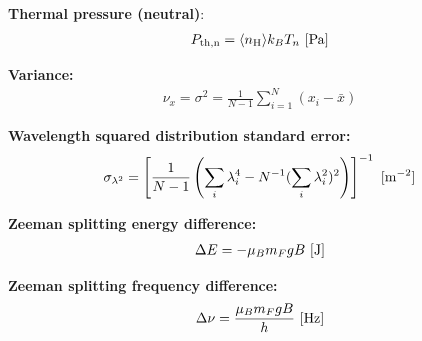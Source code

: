 \documentclass[a4paper,10pt]{article}
\begin{document}
{\noindent}\textbf{Thermal pressure (neutral)}:
\begin{align*}
    P_{\rm th,n} = \langle n_{\rm H}\rangle k_BT_n ~ [{\rm Pa}]
\end{align*}

{\noindent}\textbf{Variance:}
\begin{align*}
    \nu_x = \sigma^2= \frac{1}{N-1} \sum_{i=1}^N (x_i-\bar{x})
\end{align*}

{\noindent}\textbf{Wavelength squared distribution standard error:} 
\begin{align*}
\sigma_{\lambda^2} = \left[ \dfrac{1}{N-1} \left( \sum_i\lambda_i^4 - N^{-1}(\sum_i\lambda_i^2)^2 \right) \right]^{-1} ~ [{\rm m^{-2}}]
\end{align*}

{\noindent}\textbf{Zeeman splitting energy difference:}
\begin{align*}
    \Delta E = -\mu_Bm_FgB ~ [{\rm J}]
\end{align*}

{\noindent}\textbf{Zeeman splitting frequency difference:}
\begin{align*}
    \Delta\nu = \frac{\mu_Bm_FgB}{h} ~ [{\rm Hz}]
\end{align*}
\end{document}
